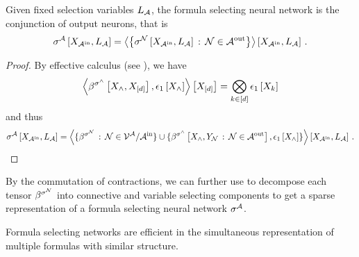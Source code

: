 \begin{theorem}
    Given fixed selection variables $L_{\mathcal{A}}$, the formula selecting neural network is the conjunction of output neurons, that is
    \begin{align*}
        \fsnnat{\catvariableof{\inneuronset},\selvariableof{\larchitecture}} %
        = \contractionof{\left\{\lneuractivationat{\catvariableof{\inneuronset},\selvariableof{\larchitecture}} \wcols \lneuron\in\outneuronset\right\}}{\catvariableof{\inneuronset},\selvariableof{\larchitecture}} \, .
    \end{align*}
\end{theorem}
\begin{proof}
    By effective calculus (see ), we have
    \[ \left\langle \beta^{\sigma^{\land}}\left[X_{\land},X_{[d]}\right],\epsilon_{1}\left[X_{\land}\right]\right\rangle \left[ X_{[d]} \right] = \bigotimes_{k\in[d]} \epsilon_{1}\left[X_{k}\right] \]
    and thus
    \begin{align*}
        \sigma^{\mathcal{A}}\left[X_{\mathcal{A}^{\mathrm{in}}},L_{\mathcal{A}}\right]
        = \left\langle 
            \{\beta^{\sigma^{\mathcal{N}}} \,:\, \mathcal{N}\in\mathcal{V}^{\mathcal{A}}/\mathcal{A}^{\mathrm{in}} \} \cup \{\beta^{\sigma^{\land}}\left[X_{\land},Y_{\mathcal{N}}  \,:\, \mathcal{N}\in\mathcal{A}^{\mathrm{out}}\right], \epsilon_{1}\left[X_{\land}\right]\}
        \right\rangle \left[ X_{\mathcal{A}^{\mathrm{in}}},L_{\mathcal{A}} \right] \, .
    \end{align*}
\end{proof}


By the commutation of contractions, we can further use  to decompose each tensor $\beta^{\sigma^{\mathcal{N}}}$ into connective and variable selecting components to get a sparse representation of a formula selecting neural network $\sigma^{\mathcal{A}}$.



Formula selecting networks are efficient in the simultaneous representation of multiple formulas with similar structure.




